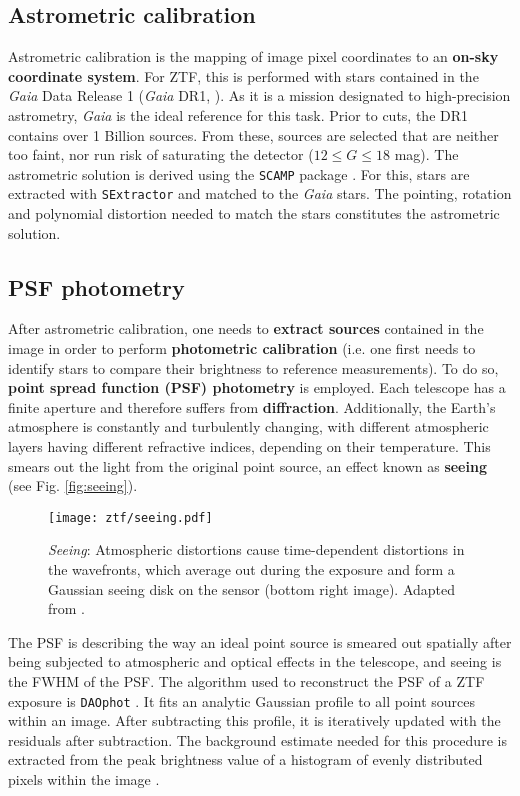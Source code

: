 \subsection{Astrometric calibration}
Astrometric calibration is the mapping of image pixel coordinates to an \textbf{on-sky coordinate system}. For ZTF, this is performed with stars contained in the \textit{Gaia} Data Release 1 (\textit{Gaia} DR1, ). As it is a mission designated to high-precision astrometry, \textit{Gaia} is the ideal reference for this task. Prior to cuts, the DR1 contains over 1 Billion sources. From these, sources are selected that are neither too faint, nor run risk of saturating the detector ($12 \leq G \leq 18$ mag). The astrometric solution is derived using the \texttt{SCAMP}  package . For this, stars are extracted with \texttt{SExtractor}  and matched to the \textit{Gaia} stars. The pointing, rotation and polynomial distortion needed to match the stars constitutes the astrometric solution.

\subsection{PSF photometry} \label{psfphot}
After astrometric calibration, one needs to \textbf{extract sources} contained in the image in order to perform \textbf{photometric calibration} (i.e. one first needs to identify stars to compare their brightness to reference measurements). To do so, \textbf{point spread function (PSF) photometry} is employed. Each telescope has a finite aperture and therefore suffers from \textbf{diffraction}. Additionally, the Earth's atmosphere is constantly and turbulently changing, with different atmospheric layers having different refractive indices, depending on their temperature. This smears out the light from the original point source, an effect known as \textbf{seeing} (see Fig. \ref{fig:seeing}).

\begin{figure}[h!]
    \texttt{[image: ztf/seeing.pdf]}
    \caption[Seeing]{\textit{Seeing}: Atmospheric distortions cause time-dependent distortions in the wavefronts, which average out during the exposure and form a Gaussian seeing disk on the sensor (bottom right image). Adapted from \cite{Chromey2016}.}
\end{figure}

The PSF is describing the way an ideal point source is smeared out spatially after being subjected to atmospheric and optical effects in the telescope, and seeing is the FWHM of the PSF. The algorithm used to reconstruct the PSF of a ZTF exposure is \texttt{DAOphot} . It fits an analytic Gaussian profile to all point sources within an image. After subtracting this profile, it is iteratively updated with the residuals after subtraction. The background estimate needed for this procedure is extracted from the peak brightness value of a histogram of evenly distributed pixels within the image \cite{Stetson1987}.

